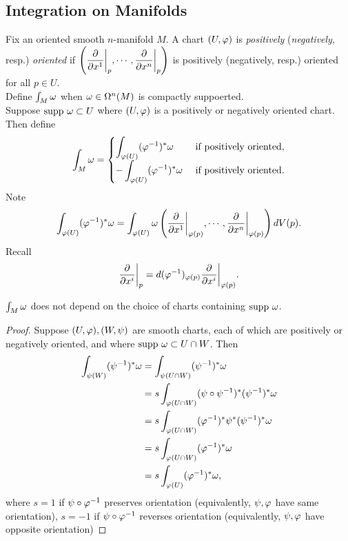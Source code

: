 \subsection{Integration on Manifolds}
Fix an oriented smooth $n$-manifold $M$. A chart $(U,\varphi)$ is \textit{positively} (\textit{negatively}, resp.) \textit{oriented} if $\displaystyle{\left(\pdv{}{x^1}\bigg|_{p},\cdots,\pdv{}{x^n}\bigg|_{p}\right) }$ is positively (negatively, resp.) oriented for all $p \in U$. \\
 Define $\int_M \omega$ when $\omega \in \Omega^n(M)$ is compactly suppoerted. \\
 Suppose $\mathrm{supp~} \omega \subset U$ where $(U,\varphi)$ is a positively or negatively oriented chart. Then define 
$${\everymath{\displaystyle}\int_M \omg = \begin{cases}
\int_{\phe(U)} (\phe^{-1})^* \omg & \text{ if positively oriented}, \\
-\int_{\phe(U)} (\phe^{-1})^* \omg & \text{ if positively oriented}.
\end{cases}
}$$
Note 
$$\int_{\varphi(U)} (\varphi^{-1})^* \omega
= \int_{\varphi(U)} \omega\left(\pdv{}{x^1}\bigg|_{\varphi(p)}, \cdots, \pdv{}{x^n}\bigg|_{\varphi(p)}\right) dV(p). $$ Recall 
$$\pdv{}{x^i}\bigg|_{p} = d(\varphi^{-1})_{\varphi(p)}\pdv{}{x^i}\bigg|_{\varphi(p)}.$$
\begin{proposition}\label{16.4}
    $\int_M \omega$ does not depend on the choice of charts containing $\mathrm{supp~} \omega$. 
\end{proposition}
\begin{proof}
    Suppose $(U,\varphi), (W,\psi)$ are smooth charts, each of which are positively or negatively oriented, and where $\mathrm{supp~} \omega \subset U \cap W$. Then 
    \begin{align*}
    \int_{\psi(W)}(\psi^{-1})^*\omega 
    &= \int_{\psi(U \cap W)}(\psi^{-1})^* \omega \\
    &= s\int_{\varphi(U \cap W)}(\psi \circ \psi^{-1})^*(\psi^{-1})^* \omega \\
    &= s\int_{\varphi(U \cap W)}(\varphi^{-1})^*\psi^*(\psi^{-1})^*\omega \\
    &= s\int_{\varphi(U \cap W)}(\varphi^{-1})^* \omega \\
    &= s\int_{\varphi(U)}(\varphi^{-1})^*\omega, 
    \end{align*}
    where $s = 1$ if $\psi \circ \varphi^{-1}$ preserves orientation (equivalently, $\psi, \varphi$ have same orientation), $s=-1$ if $\psi \circ \varphi^{-1}$ reverses orientation (equivalently, $\psi, \varphi$ have opposite orientation)
\end{proof}

